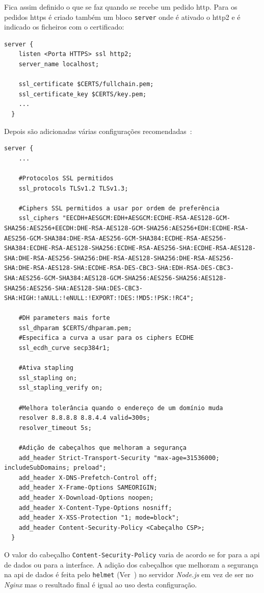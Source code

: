 Fica assim definido o que se faz quando se recebe um pedido \acrshort{http}. Para os pedidos \acrshort{https} é criado também um bloco \texttt{server} onde é ativado o \acrshort{http}2 e é indicado os ficheiros com o certificado:
\begin{lstlisting}[caption=Certificado na configuração \textit{Nginx}]
  server {
    listen <Porta HTTPS> ssl http2;
    server_name localhost;

    ssl_certificate $CERTS/fullchain.pem;
    ssl_certificate_key $CERTS/key.pem;
    ...
  }
\end{lstlisting}
Depois são adicionadas várias configurações recomendadas~\cite{helmet,letEnA+,dhparams,secExpress,strongSSL,helmetCSP,csp,hsts,hsts2}:
\begin{lstlisting}[caption=Recomendações de segurança na configuração \textit{Nginx}]
  server {
    ...

    #Protocolos SSL permitidos
    ssl_protocols TLSv1.2 TLSv1.3;

    #Ciphers SSL permitidos a usar por ordem de preferência
    ssl_ciphers "EECDH+AESGCM:EDH+AESGCM:ECDHE-RSA-AES128-GCM-SHA256:AES256+EECDH:DHE-RSA-AES128-GCM-SHA256:AES256+EDH:ECDHE-RSA-AES256-GCM-SHA384:DHE-RSA-AES256-GCM-SHA384:ECDHE-RSA-AES256-SHA384:ECDHE-RSA-AES128-SHA256:ECDHE-RSA-AES256-SHA:ECDHE-RSA-AES128-SHA:DHE-RSA-AES256-SHA256:DHE-RSA-AES128-SHA256:DHE-RSA-AES256-SHA:DHE-RSA-AES128-SHA:ECDHE-RSA-DES-CBC3-SHA:EDH-RSA-DES-CBC3-SHA:AES256-GCM-SHA384:AES128-GCM-SHA256:AES256-SHA256:AES128-SHA256:AES256-SHA:AES128-SHA:DES-CBC3-SHA:HIGH:!aNULL:!eNULL:!EXPORT:!DES:!MD5:!PSK:!RC4";

    #DH parameters mais forte
    ssl_dhparam $CERTS/dhparam.pem;
    #Especifica a curva a usar para os ciphers ECDHE
    ssl_ecdh_curve secp384r1;

    #Ativa stapling
    ssl_stapling on;
    ssl_stapling_verify on;

    #Melhora tolerância quando o endereço de um domínio muda
    resolver 8.8.8.8 8.8.4.4 valid=300s;
    resolver_timeout 5s;

    #Adição de cabeçalhos que melhoram a segurança
    add_header Strict-Transport-Security "max-age=31536000; includeSubDomains; preload";
    add_header X-DNS-Prefetch-Control off;
    add_header X-Frame-Options SAMEORIGIN;
    add_header X-Download-Options noopen;
    add_header X-Content-Type-Options nosniff;
    add_header X-XSS-Protection "1; mode=block";
    add_header Content-Security-Policy <Cabeçalho CSP>;
  }
\end{lstlisting}
O valor do cabeçalho \texttt{Content-Security-Policy} varia de acordo se for para a \acrshort{api} de dados ou para a interface. A adição dos cabeçalhos que melhoram a segurança na \acrshort{api} de dados é feita pelo \texttt{helmet} (Ver~\cite{helmet}) no servidor \textit{Node.js} em vez de ser no \textit{Nginx} mas o resultado final é igual ao uso desta configuração.

